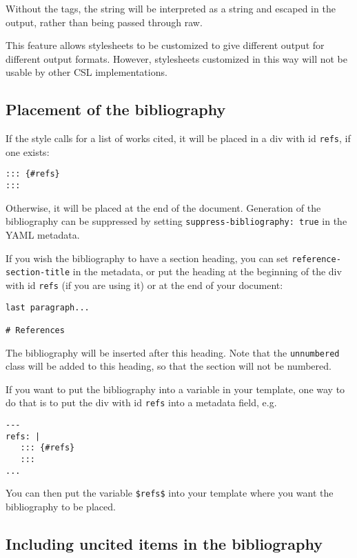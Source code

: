 \documentclass[
]{article}
\begin{document}
Without the tags, the string will be interpreted as a string and escaped
in the output, rather than being passed through raw.

This feature allows stylesheets to be customized to give different
output for different output formats. However, stylesheets customized in
this way will not be usable by other CSL implementations.

\subsection{Placement of the
bibliography}\label{placement-of-the-bibliography}

If the style calls for a list of works cited, it will be placed in a div
with id \texttt{refs}, if one exists:

\begin{verbatim}
::: {#refs}
:::
\end{verbatim}

Otherwise, it will be placed at the end of the document. Generation of
the bibliography can be suppressed by setting
\texttt{suppress-bibliography:\ true} in the YAML metadata.

If you wish the bibliography to have a section heading, you can set
\texttt{reference-section-title} in the metadata, or put the heading at
the beginning of the div with id \texttt{refs} (if you are using it) or
at the end of your document:

\begin{verbatim}
last paragraph...

# References
\end{verbatim}

The bibliography will be inserted after this heading. Note that the
\texttt{unnumbered} class will be added to this heading, so that the
section will not be numbered.

If you want to put the bibliography into a variable in your template,
one way to do that is to put the div with id \texttt{refs} into a
metadata field, e.g.

\begin{verbatim}
---
refs: |
   ::: {#refs}
   :::
...
\end{verbatim}

You can then put the variable \texttt{\$refs\$} into your template where
you want the bibliography to be placed.

\subsection{Including uncited items in the
bibliography}\label{including-uncited-items-in-the-bibliography}
\end{document}
